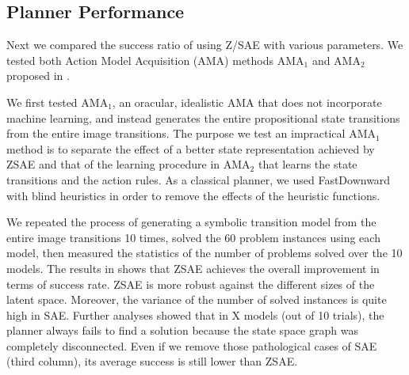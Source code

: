 
\subsection{Planner Performance}

Next we compared the success ratio of \latentplanner using Z/SAE with various parameters.
We tested both Action Model Acquisition (AMA) methods AMA$_1$ and AMA$_2$ proposed in \cite{Asai2018}.

We first tested AMA$_1$, an oracular, idealistic AMA that does not incorporate machine learning,
and instead generates the entire propositional state transitions from the entire image transitions.
The purpose we test an impractical AMA$_1$ method is
to separate the effect of a better state representation achieved by ZSAE
and that of the learning procedure in AMA$_2$ that learns the state transitions and the action rules.
As a classical planner, we used FastDownward \cite{Helmert04} with blind heuristics in order to
remove the effects of the heuristic functions.

We repeated the process of generating a symbolic transition model from the entire image transitions 10 times,
solved the 60 problem instances using each model,
then measured the statistics of the number of problems solved over the 10 models.
The results in  shows that ZSAE achieves the overall improvement in terms of success rate.
ZSAE is more robust against the different sizes of the latent space.
Moreover, the variance of the number of solved instances is quite high in SAE.
% 
Further analyses showed that
in X models (out of 10 trials), the planner always fails to find a solution because
the state space graph was completely disconnected.
% 
Even if we remove those pathological cases of SAE (third column), its average success is still
lower than ZSAE.

